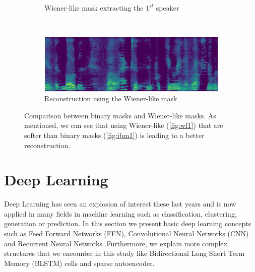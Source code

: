 \documentclass[master, tikz, final,11pt, dvipdfmx]{iscs-thesis}
\begin{document}
\begin{figure}[h]
\begin{subfigure}[b]{0.45\textwidth}
\captionsetup{justification=centering}
\caption{Wiener-like mask extracting the  $1^{st}$ speaker}
\label{fig:wf1} 
\end{subfigure}
~
\begin{subfigure}[b]{0.45\textwidth}
\includegraphics[width=\textwidth]{sepwf1}
\captionsetup{justification=centering}
\caption{Reconstruction using the Wiener-like mask}
\label{fig:ibmsep1} 
\end{subfigure}
\captionsetup{justification=centering}
\caption[IBM and Wiener-like masks comparison]{Comparison between binary masks and Wiener-like masks. As mentioned, we can see that using Wiener-like (\autoref{fig:wf1}) that are softer than binary masks (\autoref{fig:ibm1}) is leading to a better reconstruction.}
\label{fig:masking} 

\end{figure}

\section{Deep Learning}

Deep Learning \cite{DL, DLBOOK} has seen an explosion of interest these last years and is now applied in many fields in machine learning such as classification, clustering, generation or prediction. In this section we present basic deep learning concepts such as Feed Forward Networks (FFN), Convolutional Neural Networks (CNN) and Recurrent Neural Networks. Furthermore, we explain more complex structures that we encounter in this study like Bidirectional Long Short Term Memory (BLSTM) cells and sparse autoencoder.
\end{document}
